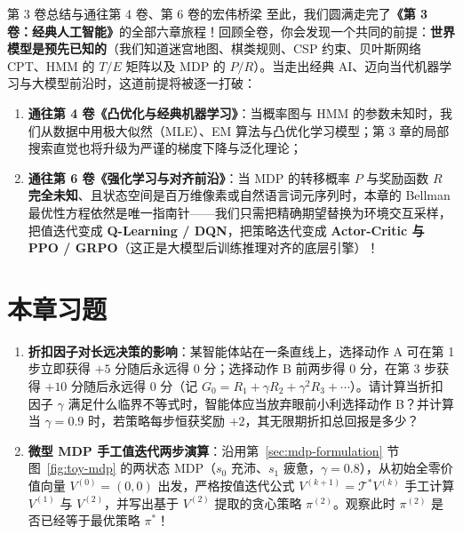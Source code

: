 \begin{insightBox}{第 3 卷总结与通往第 4 卷、第 6 卷的宏伟桥梁}
至此，我们圆满走完了\textbf{《第 3 卷：经典人工智能》}的全部六章旅程！回顾全卷，你会发现一个共同的前提：\textbf{世界模型是预先已知的}（我们知道迷宫地图、棋类规则、CSP 约束、贝叶斯网络 CPT、HMM 的 $T/E$ 矩阵以及 MDP 的 $P/R$）。当走出经典 AI、迈向当代机器学习与大模型前沿时，这道前提将被逐一打破：
\begin{enumerate}
  \item \textbf{通往第 4 卷《凸优化与经典机器学习》}：当概率图与 HMM 的参数未知时，我们从数据中用极大似然（MLE）、EM 算法与凸优化学习模型；第 3 章的局部搜索直觉也将升级为严谨的梯度下降与泛化理论；
  \item \textbf{通往第 6 卷《强化学习与对齐前沿》}：当 MDP 的转移概率 $P$ 与奖励函数 $R$ \textbf{完全未知}、且状态空间是百万维像素或自然语言词元序列时，本章的 Bellman 最优性方程依然是唯一指南针——我们只需把精确期望替换为环境交互采样，把值迭代变成 \textbf{Q-Learning / DQN}，把策略迭代变成 \textbf{Actor-Critic 与 PPO / GRPO}（这正是大模型后训练推理对齐的底层引擎）！
\end{enumerate}
\end{insightBox}

\section{本章习题}\label{sec:ch6-ex}


\begin{enumerate}[label=\textbf{6.\arabic*}]
  \item \textbf{折扣因子对长远决策的影响}：某智能体站在一条直线上，选择动作 A 可在第 1 步立即获得 $+5$ 分随后永远得 $0$ 分；选择动作 B 前两步得 $0$ 分，在第 3 步获得 $+10$ 分随后永远得 $0$ 分（记 $G_0 = R_1 + \gamma R_2 + \gamma^2 R_3 + \cdots$）。请计算当折扣因子 $\gamma$ 满足什么临界不等式时，智能体应当放弃眼前小利选择动作 B？并计算当 $\gamma = 0.9$ 时，若策略每步恒获奖励 $+2$，其无限期折扣总回报是多少？

  \item \textbf{微型 MDP 手工值迭代两步演算}：沿用第~\ref{sec:mdp-formulation} 节图~\ref{fig:toy-mdp} 的两状态 MDP（$s_0$ 充沛、$s_1$ 疲惫，$\gamma = 0.8$），从初始全零价值向量 $V^{(0)} = (0, 0)$ 出发，严格按值迭代公式 $V^{(k+1)} = \mathcal{T}^* V^{(k)}$ 手工计算 $V^{(1)}$ 与 $V^{(2)}$，并写出基于 $V^{(2)}$ 提取的贪心策略 $\pi^{(2)}$。观察此时 $\pi^{(2)}$ 是否已经等于最优策略 $\pi^*$！
\end{enumerate}

